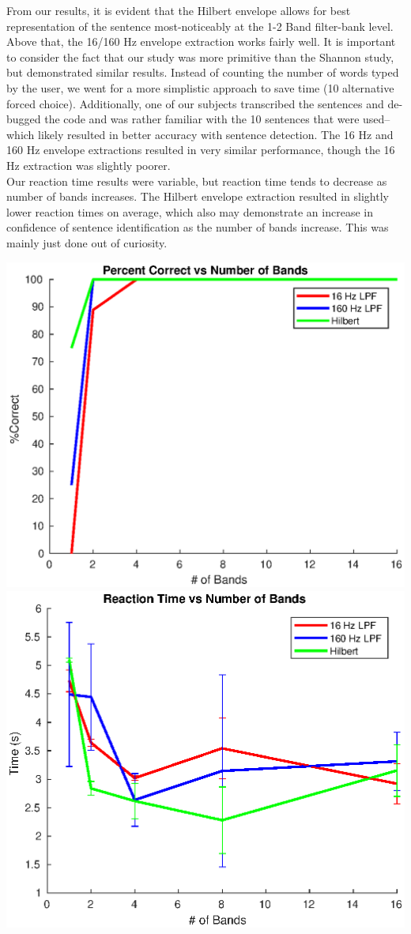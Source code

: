 \documentclass[9pt]{extarticle}
\begin{document}
\begin{enumerate}[label = \alph*) ]
From our results, it is evident that the Hilbert envelope allows for best representation of the sentence most-noticeably at the 1-2 Band filter-bank level. Above that, the 16/160 Hz envelope extraction works fairly well. It is important to consider the fact that our study was more primitive than the Shannon study, but demonstrated similar results. Instead of counting the number of words typed by the user, we went for a more simplistic approach to save time (10 alternative forced choice). Additionally, one of our subjects transcribed the sentences and de-bugged the code and was rather familiar with the 10 sentences that were used-- which likely resulted in better accuracy with sentence detection. The 16 Hz and 160 Hz envelope extractions resulted in very similar performance, though the 16 Hz extraction was slightly poorer.  \\

Our reaction time results were variable, but reaction time tends to decrease as number of bands increases. The Hilbert envelope extraction resulted in slightly lower reaction times on average, which also may demonstrate an increase in confidence of sentence identification as the number of bands increase. This was mainly just done out of curiosity.

\begin{center}
\includegraphics[width = .47\textwidth]{figA1}
\includegraphics[width = .47\textwidth]{figA2}
\end{center}

\end{enumerate}
\end{document}
